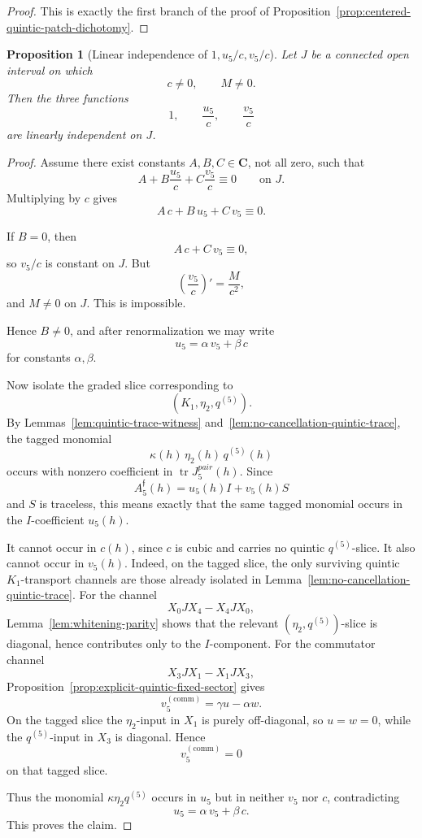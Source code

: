 \documentclass[11pt,a4paper]{amsart}
\def\pair{pair}%
\theoremstyle{plain}
\newtheorem{proposition}[theorem]{Proposition}
\theoremstyle{definition}
\newcommand{\pair}{\mathrm{pair}}
\begin{document}
\begin{proof}
This is exactly the first branch of the proof of
Proposition~\ref{prop:centered-quintic-patch-dichotomy}.
\end{proof}

\begin{proposition}[Linear independence of $1,u_5/c,v_5/c$]
\label{prop:linear-independence-one-u5-over-c-v5-over-c}
Let $J$ be a connected open interval on which
\[
c\neq 0,
\qquad
M\neq 0.
\]
Then the three functions
\[
1,
\qquad
\frac{u_5}{c},
\qquad
\frac{v_5}{c}
\]
are linearly independent on $J$.
\end{proposition}

\begin{proof}
Assume there exist constants $A,B,C\in\mathbf C$, not all zero, such that
\[
A+B\frac{u_5}{c}+C\frac{v_5}{c}\equiv 0
\qquad\text{on }J.
\]
Multiplying by $c$ gives
\[
A\,c+B\,u_5+C\,v_5\equiv 0.
\]

If $B=0$, then
\[
A\,c+C\,v_5\equiv 0,
\]
so $v_5/c$ is constant on $J$. But
\[
\left(\frac{v_5}{c}\right)'=\frac{M}{c^2},
\]
and $M\neq 0$ on $J$. This is impossible.

Hence $B\neq 0$, and after renormalization we may write
\[
u_5=\alpha\,v_5+\beta\,c
\]
for constants $\alpha,\beta$.

Now isolate the graded slice corresponding to
\[
(K_1,\eta_2,q^{(5)}).
\]
By Lemmas~\ref{lem:quintic-trace-witness}
and~\ref{lem:no-cancellation-quintic-trace}, the tagged monomial
\[
\kappa(h)\,\eta_2(h)\,q^{(5)}(h)
\]
occurs with nonzero coefficient in $\operatorname{tr}J_5^{\pair}(h)$.
Since
\[
A_5^{\mathfrak f}(h)=u_5(h)I+v_5(h)S
\]
and $S$ is traceless, this means exactly that the same tagged monomial
occurs in the $I$-coefficient $u_5(h)$.

It cannot occur in $c(h)$, since $c$ is cubic and carries no quintic
$q^{(5)}$-slice. It also cannot occur in $v_5(h)$. Indeed, on the tagged
slice, the only surviving quintic $K_1$-transport channels are those already
isolated in Lemma~\ref{lem:no-cancellation-quintic-trace}. For the channel
\[
X_0JX_4-X_4JX_0,
\]
Lemma~\ref{lem:whitening-parity} shows that the relevant
$(\eta_2,q^{(5)})$-slice is diagonal, hence contributes only to the
$I$-component. For the commutator channel
\[
X_3JX_1-X_1JX_3,
\]
Proposition~\ref{prop:explicit-quintic-fixed-sector} gives
\[
v_5^{(\mathrm{comm})}=\gamma u-\alpha w.
\]
On the tagged slice the $\eta_2$-input in $X_1$ is purely off-diagonal, so
$u=w=0$, while the $q^{(5)}$-input in $X_3$ is diagonal. Hence
\[
v_5^{(\mathrm{comm})}=0
\]
on that tagged slice.

Thus the monomial $\kappa\eta_2 q^{(5)}$ occurs in $u_5$ but in neither
$v_5$ nor $c$, contradicting
\[
u_5=\alpha\,v_5+\beta\,c.
\]
This proves the claim.
\end{proof}
\end{document}
